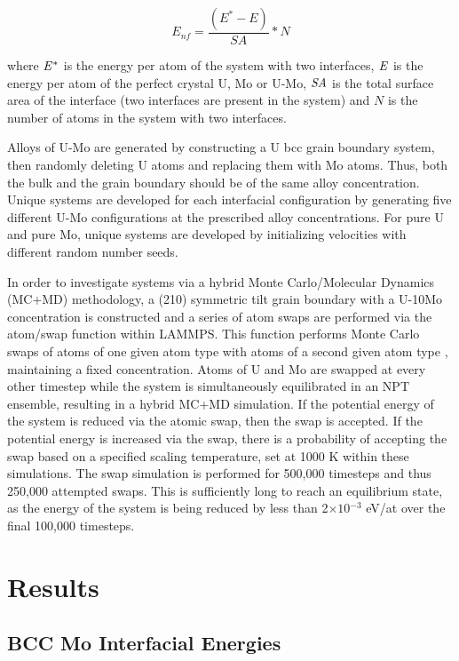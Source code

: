 \documentclass[review]{elsarticle}
\begin{document}
\begin{equation}
\label{eq:surface}
E_{nf}= \frac{(E^{*} - E)}{SA} * N
\end{equation}

where $\it{E^{*}}$ is the energy per atom of the system with two interfaces, $\it{E}$ is the energy per atom of the perfect crystal U, Mo or U-Mo, $\it{SA}$ is the total surface area of the interface (two interfaces are present in the system) and $\textit{N}$ is the number of atoms in the system with two interfaces. 

Alloys of U-Mo are generated by constructing a U bcc grain boundary system, then randomly deleting U atoms and replacing them with Mo atoms. Thus, both the bulk and the grain boundary should be of the same alloy concentration. Unique systems are developed for each interfacial configuration by generating five different U-Mo configurations at the prescribed alloy concentrations. For pure U and pure Mo, unique systems are developed by initializing velocities with different random number seeds. 

In order to investigate systems via a hybrid Monte Carlo/Molecular Dynamics (MC+MD) methodology, a (210) symmetric tilt grain boundary with a U-10Mo concentration is constructed and a series of atom swaps are performed via the atom/swap function within LAMMPS. This function performs Monte Carlo swaps of atoms of one given atom type with atoms of a second given atom type \cite{plimpton1995}, maintaining a fixed concentration. Atoms of U and Mo are swapped at every other timestep while the system is simultaneously equilibrated in an NPT ensemble, resulting in a hybrid MC+MD simulation. If the potential energy of the system is reduced via the atomic swap, then the swap is accepted. If the potential energy is increased via the swap, there is a probability of accepting the swap based on a specified scaling temperature, set at 1000 K within these simulations. The swap simulation is performed for 500,000 timesteps and thus 250,000 attempted swaps. This is sufficiently long to reach an equilibrium state, as the energy of the system is being reduced by less than 2$\times1$0$^{-3}$ eV/at over the final 100,000 timesteps.

\section{Results}
\subsection{BCC Mo Interfacial Energies}
\end{document}
